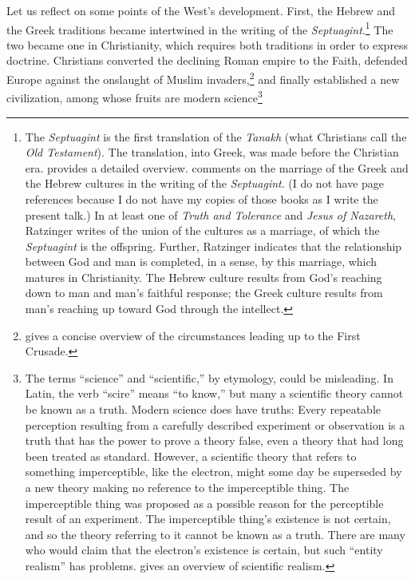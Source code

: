 \documentclass[twocolumn]{article}
\begin{document}
Let us reflect on some points of the West's development.  First, the Hebrew and
the Greek traditions became intertwined in the writing of the {\it
Septuagint}.\footnote{%
   The {\it Septuagint} is the first translation of the {\it Tanakh} (what
   Christians call the {\it Old Testament}).  The translation, into Greek, was
   made before the Christian era.  \cite{vdh1912} provides a detailed overview.
   \cite{r2005, r2007} comments on the marriage of the Greek and the Hebrew
   cultures in the writing of the {\it Septuagint}. (I do not have page
   references because I do not have my copies of those books as I write the
   present talk.)  In at least one of {\it Truth and Tolerance} and {\it Jesus
   of Nazareth}, Ratzinger writes of the union of the cultures as a marriage,
   of which the {\it Septuagint} is the offspring. Further, Ratzinger indicates
   that the relationship between God and man is completed, in a sense, by this
   marriage, which matures in Christianity.  The Hebrew culture results from
   God's reaching down to man and man's faithful response; the Greek culture
   results from man's reaching up toward God through the intellect.
}
The two became one in Christianity, which requires both traditions in order to
express doctrine.  Christians converted the declining Roman empire to the
Faith, defended Europe against the onslaught of Muslim invaders,\footnote{%
   \citet[Chapter 4]{b1938} gives a concise overview of the circumstances
   leading up to the First Crusade.
}
and finally established a new civilization, among whose fruits are modern
science\footnote{%
   The terms ``science'' and ``scientific,'' by etymology, could be misleading.
   In Latin, the verb ``scire'' means ``to know,'' but many a scientific theory
   cannot be known as a truth.  Modern science does have truths: Every
   repeatable perception resulting from a carefully described experiment or
   observation is a truth that has the power to prove a theory false, even a
   theory that had long been treated as standard.  However, a scientific theory
   that refers to something imperceptible, like the electron, might some day be
   superseded by a new theory making no reference to the imperceptible thing.
   The imperceptible thing was proposed as a possible reason for the
   perceptible result of an experiment.  The imperceptible thing's existence is
   not certain, and so the theory referring to it cannot be known as a truth.
   There are many who would claim that the electron's existence is certain, but
   such ``entity realism'' has problems.  \cite{c2016} gives an overview of
   scientific realism.%
}
\end{document}
